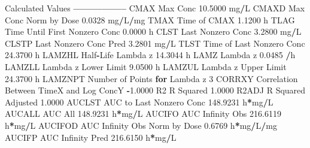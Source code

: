 \documentclass[12pt,]{krantz}
\newenvironment{Shaded}{\begin{snugshade}}{\end{snugshade}}
\newcommand{\DecValTok}[1]{\textcolor[rgb]{0.00,0.00,0.81}{#1}}
\newcommand{\FloatTok}[1]{\textcolor[rgb]{0.00,0.00,0.81}{#1}}
\newcommand{\ControlFlowTok}[1]{\textcolor[rgb]{0.13,0.29,0.53}{\textbf{#1}}}
\newcommand{\OperatorTok}[1]{\textcolor[rgb]{0.81,0.36,0.00}{\textbf{#1}}}
\newcommand{\NormalTok}[1]{#1}
\theoremstyle{definition}
\theoremstyle{definition}
\theoremstyle{definition}
\theoremstyle{remark}
\begin{document}
\begin{Shaded}
\begin{Highlighting}[]
\NormalTok{Calculated Values}
\OperatorTok{-----------------}
\NormalTok{CMAX       Max Conc                                       }\FloatTok{10.5000}\NormalTok{ mg}\OperatorTok{/}\NormalTok{L}
\NormalTok{CMAXD      Max Conc Norm by Dose                           }\FloatTok{0.0328}\NormalTok{ mg}\OperatorTok{/}\NormalTok{L}\OperatorTok{/}\NormalTok{mg}
\NormalTok{TMAX       Time of CMAX                                    }\FloatTok{1.1200}\NormalTok{ h}
\NormalTok{TLAG       Time Until First Nonzero Conc                   }\FloatTok{0.0000}\NormalTok{ h}
\NormalTok{CLST       Last Nonzero Conc                               }\FloatTok{3.2800}\NormalTok{ mg}\OperatorTok{/}\NormalTok{L}
\NormalTok{CLSTP      Last Nonzero Conc Pred                          }\FloatTok{3.2801}\NormalTok{ mg}\OperatorTok{/}\NormalTok{L}
\NormalTok{TLST       Time of Last Nonzero Conc                      }\FloatTok{24.3700}\NormalTok{ h}
\NormalTok{LAMZHL     Half}\OperatorTok{-}\NormalTok{Life Lambda z                             }\FloatTok{14.3044}\NormalTok{ h}
\NormalTok{LAMZ       Lambda z                                        }\FloatTok{0.0485} \OperatorTok{/}\NormalTok{h}
\NormalTok{LAMZLL     Lambda z Lower Limit                            }\FloatTok{9.0500}\NormalTok{ h}
\NormalTok{LAMZUL     Lambda z Upper Limit                           }\FloatTok{24.3700}\NormalTok{ h}
\NormalTok{LAMZNPT    Number of Points }\ControlFlowTok{for}\NormalTok{ Lambda z                   }\DecValTok{3}
\NormalTok{CORRXY     Correlation Between TimeX and Log ConcY        }\OperatorTok{-}\FloatTok{1.0000} 
\NormalTok{R2         R Squared                                       }\FloatTok{1.0000} 
\NormalTok{R2ADJ      R Squared Adjusted                              }\FloatTok{1.0000} 
\NormalTok{AUCLST     AUC to Last Nonzero Conc                      }\FloatTok{148.9231}\NormalTok{ h}\OperatorTok{*}\NormalTok{mg}\OperatorTok{/}\NormalTok{L}
\NormalTok{AUCALL     AUC All                                       }\FloatTok{148.9231}\NormalTok{ h}\OperatorTok{*}\NormalTok{mg}\OperatorTok{/}\NormalTok{L}
\NormalTok{AUCIFO     AUC Infinity Obs                              }\FloatTok{216.6119}\NormalTok{ h}\OperatorTok{*}\NormalTok{mg}\OperatorTok{/}\NormalTok{L}
\NormalTok{AUCIFOD    AUC Infinity Obs Norm by Dose                   }\FloatTok{0.6769}\NormalTok{ h}\OperatorTok{*}\NormalTok{mg}\OperatorTok{/}\NormalTok{L}\OperatorTok{/}\NormalTok{mg}
\NormalTok{AUCIFP     AUC Infinity Pred                             }\FloatTok{216.6150}\NormalTok{ h}\OperatorTok{*}\NormalTok{mg}\OperatorTok{/}\NormalTok{L}

\end{Highlighting}
\end{Shaded}
\end{document}
